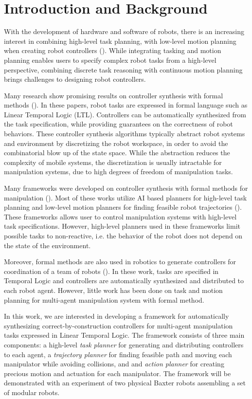 \section{Introduction and Background}
With the development of hardware and software of robots,
there is an increasing interest in combining high-level task planning,
with low-level motion planning when creating robot controllers ().
While integrating tasking and motion planning enables users to specify complex robot tasks from a high-level perspective,
combining discrete task reasoning with continuous motion planning brings challenges to designing robot controllers.

Many research show promising results on controller synthesis with formal methods ().
In these papers, robot tasks are expressed in formal language such as Linear Temporal Logic (LTL).
Controllers can be automatically synthesized from the task specification,
while providing guarantees on the correctness of robot behaviors.
These controller synthesis algorithms typically abstract robot systems and environment by discretizing the robot workspace,
in order to avoid the combinatorial blow up of the state space.
While the abstraction reduces the complexity of mobile systems,
the discretization is usually intractable for manipulation systems,
due to high degrees of freedom of manipulation tasks.

Many frameworks were developed on controller synthesis with formal methods for manipulation ().
Most of these works utilize AI based planners for high-level task planning and low-level motion planners for finding feasible robot trajectories ().
These frameworks allows user to control manipulation systems with high-level task specifications.
However, high-level planners used in these frameworks limit possible tasks to non-reactive,
i.e. the behavior of the robot does not depend on the state of the environment.

Moreover, formal methods are also used in robotics to generate controllers for coordination of a team of robots ().
In these work, tasks are specified in Temporal Logic and controllers are automatically synthesized and distributed to each robot agent. 
However, little work has been done on task and motion planning for multi-agent manipulation system with formal method.

In this work, we are interested in developing a framework for automatically synthesizing correct-by-construction controllers
for multi-agent manipulation tasks expressed in Linear Temporal Logic. The framework consists of three main components:
a high-level {\it task planner} for generating and distributing controllers to each agent,
a {\it trajectory planner} for finding feasible path and moving each manipulator while avoiding collisions,
and and {\it action planner} for creating precious motion and actuation for each manipulator.
The framework will be demonstrated with an experiment of two physical Baxter robots assembling a set of modular robots. 

